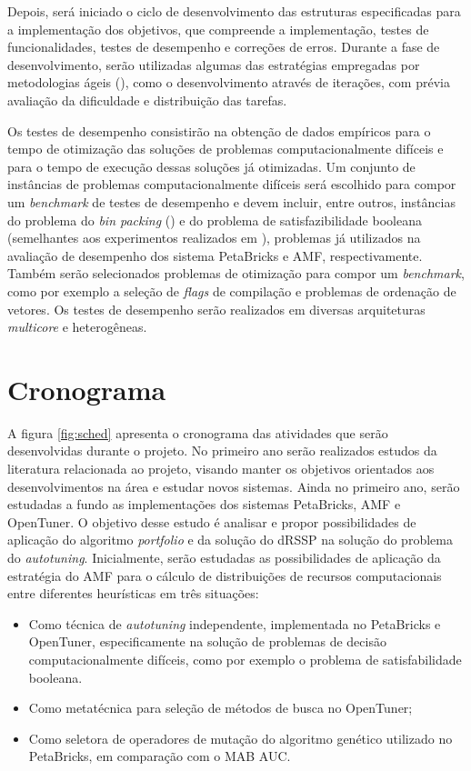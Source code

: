 \documentclass[a4paper, 12pt]{article}
\begin{document}
Depois, será iniciado o ciclo de desenvolvimento das estruturas especificadas
para a implementação dos objetivos, que compreende a implementação, 
testes de funcionalidades, testes de desempenho e correções de erros.
Durante a fase de desenvolvimento, serão utilizadas algumas das estratégias
empregadas por metodologias ágeis (\citet{beck2000extreme}), como o 
desenvolvimento através de iterações, com prévia avaliação da dificuldade e 
distribuição das tarefas.

Os testes de desempenho consistirão na obtenção de dados empíricos para o tempo
de otimização das soluções de problemas computacionalmente difíceis e para o 
tempo de execução dessas soluções já otimizadas. Um conjunto de instâncias de 
problemas computacionalmente difíceis será escolhido para compor
um \emph{benchmark} de testes de desempenho e devem incluir, entre outros, 
instâncias do problema do \emph{bin packing} (\citet{de1981bin}) e do problema 
de satisfazibilidade booleana (semelhantes aos experimentos realizados em 
\citet{goldman2011optimizing}), problemas já utilizados na avaliação de 
desempenho dos sistema PetaBricks e AMF, respectivamente. Também serão 
selecionados problemas de otimização para compor um \emph{benchmark}, como por
exemplo a seleção de \emph{flags} de compilação e problemas de ordenação de 
vetores. Os testes de desempenho serão realizados em diversas arquiteturas
\emph{multicore} e heterogêneas.

\section{Cronograma} \label{sec:sched}

A figura \ref{fig:sched} apresenta o cronograma das atividades que serão
desenvolvidas durante o projeto. 
No primeiro ano serão realizados estudos da literatura relacionada ao projeto,
visando manter os objetivos orientados aos desenvolvimentos na área e
estudar novos sistemas. Ainda no primeiro ano, serão estudadas a fundo as 
implementações dos sistemas PetaBricks, AMF e OpenTuner. O objetivo desse
estudo é analisar e propor possibilidades de aplicação do algoritmo 
\emph{portfolio} e da solução do dRSSP na solução do problema do 
\emph{autotuning}. Inicialmente, serão estudadas as possibilidades de aplicação
da estratégia do AMF para o cálculo de distribuições de recursos computacionais
entre diferentes heurísticas em três situações:

\begin{itemize}
    \item Como técnica de \emph{autotuning} independente, implementada 
        no PetaBricks e OpenTuner, especificamente na solução de problemas
        de decisão computacionalmente difíceis, como por exemplo o problema
        de satisfabilidade booleana.
    \item Como metatécnica para seleção de métodos de busca no OpenTuner;
    \item Como seletora de operadores de mutação do algoritmo genético 
        utilizado no PetaBricks, em comparação com o MAB AUC.
\end{itemize}
\end{document}
